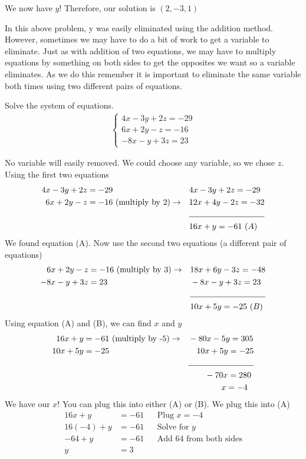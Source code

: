 We now have $y$! Therefore, our solution is $(2,-3,1)$
\begin{note}
In this above problem, y was easily eliminated using the addition method. However, sometimes we may have to do a bit of work to get a variable to eliminate. Just as with addition of two equations, we may have to multiply equations by something on both sides to get the opposites we want so a variable eliminates. As we do this remember it is important to eliminate the same variable both times using two different pairs of equations.	
\end{note}
\begin{example}
	Solve the system of equations.
		\begin{align*}
		\begin{cases}
			4x-3y+2z=-29\\
			6x+2y-z=-16\\
			-8x-y+3z=23
		\end{cases}
	\end{align*}
\end{example}
No variable will easily removed. We could choose any variable, so we chose $z$. Using the first two equations
\begin{align*}
		4x-3y+2z&=-29 && 4x-3y+2z=-29 \\
		6x+2y-z&=-16\,\, \text{(multiply by 2)} \rightarrow  && 12x+4y-2z=-32 \\
		&&&		\cline{1-2}
		&&& 16x+y=-61\,\, (A)
\end{align*}
We found equation (A). Now use the second two equations (a different pair of equations)
\begin{align*}
		6x+2y-z&=-16\,\, \text{(multiply by 3)} \rightarrow  && 18x+6y-3z=-48 \\
		-8x-y+3z&=23 && -8x-y+3z=23	\\	
		&&& \cline{1-2}
		&&& 10x+5y=-25\,\, (B)
\end{align*}
Using equation (A) and (B), we can find $x$ and $y$
\begin{align*}
		16x+y&=-61\,\, \text{(multiply by -5)} \rightarrow  && -80x-5y=305 \\
		10x+5y&=-25 && \quad 10x+5y=-25	\\	
		&&& \cline{1-2}
		&&& \qquad -70x=280 \\
		&&& \qquad \qquad x=-4
\end{align*}
We have our $x$! You can plug this into either (A) or (B). We plug this into (A)
\begin{align*}
	16x+y &=-61 && \text{Plug $x=-4$}\\
	16(-4)+y&= -61 && \text{Solve for $y$}\\
	 -64+y &= -61 && \text{Add 64 from both sides}\\
	 y &= 3 &&
\end{align*}
